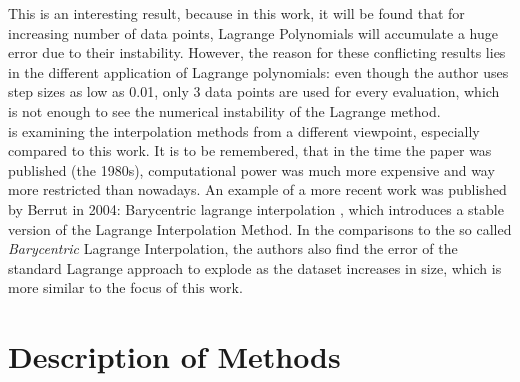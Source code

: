 \documentclass[a4paper,11pt, notitlepage]{article}
\newcommand{\enq}[1]{\grqq{}#1\grqq{}}
\begin{document}
\begin{onehalfspace}
This is an interesting result, because in this work, it will be found that for increasing number of data points, Lagrange Polynomials will accumulate a huge error due to their instability. However, the reason for these conflicting results lies in the different application of Lagrange polynomials: even though the author uses step sizes as low as 0.01, only 3 data points are used for every evaluation, which is not enough to see the numerical instability of the Lagrange method.\\




\cite{mcnamee1986comparison} is examining the interpolation methods from a different viewpoint, especially compared to this work. It is to be remembered, that in the time the paper was published (the 1980s), computational power was much more expensive and way more restricted than nowadays. An example of a more recent work was published by Berrut in 2004: \enq{Barycentric lagrange interpolation} \cite{berrut2004barycentric}, which introduces a stable version of the Lagrange Interpolation Method. In the comparisons to the so called \emph{Barycentric} Lagrange Interpolation, the authors also find the error of the standard Lagrange approach to explode as the dataset increases in size, which is more similar to the focus of this work.

\section{Description of Methods}
\label{sec:Description}


\end{onehalfspace}
\end{document}

